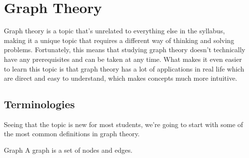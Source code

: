 \chapter{Graph Theory}
Graph theory is a topic that's unrelated to everything else in the syllabus, making it a unique topic that requires a different way of thinking and solving problems.
Fortunately, this means that studying graph theory doesn't technically have any prerequisites and can be taken at any time.
What makes it even easier to learn this topic is that graph theory has a lot of applications in real life which are direct and easy to understand, which makes concepts much more intuitive.

\section{Terminologies}
Seeing that the topic is new for most students, we're going to start with some of the most common definitions in graph theory.

\begin{definition}{Graph}
A graph is a set of nodes and edges.
\end{definition}